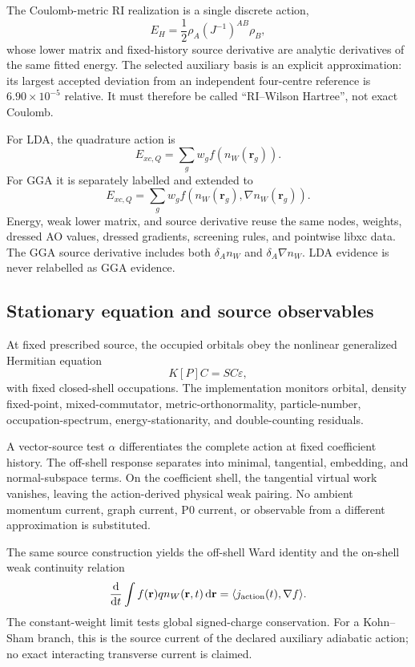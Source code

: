 \documentclass[11pt]{article}
\newcommand{\dd}{\mathrm{d}}
\newcommand{\rvec}{\mathbf r}
\begin{document}
The Coulomb-metric RI realization is a single discrete action,
\begin{equation}
 E_H=\frac12\rho_A(J^{-1})^{AB}\rho_B,
\end{equation}
whose lower matrix and fixed-history source derivative are analytic
derivatives of the same fitted energy.  The selected auxiliary basis is an
explicit approximation: its largest accepted deviation from an independent
four-centre reference is $6.90\times10^{-5}$ relative.  It must therefore be
called ``RI--Wilson Hartree'', not exact Coulomb.

For LDA, the quadrature action is
\begin{equation}
 E_{xc,Q}=\sum_g w_g f(n_W(\rvec_g)).
\end{equation}
For GGA it is separately labelled and extended to
\begin{equation}
 E_{xc,Q}=\sum_g w_g f(n_W(\rvec_g),\nabla n_W(\rvec_g)).
\end{equation}
Energy, weak lower matrix, and source derivative reuse the same nodes,
weights, dressed AO values, dressed gradients, screening rules, and
pointwise libxc data.  The GGA source derivative includes both
$\delta_A n_W$ and $\delta_A\nabla n_W$.  LDA evidence is never relabelled as
GGA evidence.

\subsection{Stationary equation and source observables}

At fixed prescribed source, the occupied orbitals obey the nonlinear
generalized Hermitian equation
\begin{equation}
 K[P]C=SC\varepsilon,
\end{equation}
with fixed closed-shell occupations.  The implementation monitors orbital,
density fixed-point, mixed-commutator, metric-orthonormality, particle-number,
occupation-spectrum, energy-stationarity, and double-counting residuals.

A vector-source test $\alpha$ differentiates the complete action at fixed
coefficient history.  The off-shell response separates into minimal,
tangential, embedding, and normal-subspace terms.  On the coefficient shell,
the tangential virtual work vanishes, leaving the action-derived physical
weak pairing.  No ambient momentum current, graph current, P0 current, or
observable from a different approximation is substituted.

The same source construction yields the off-shell Ward identity and the
on-shell weak continuity relation
\begin{equation}
 \frac{\dd}{\dd t}\int f(\rvec)q n_W(\rvec,t)\,\dd\rvec
 =\langle j_{\rm action}(t),\nabla f\rangle.
\end{equation}
The constant-weight limit tests global signed-charge conservation.  For a
Kohn--Sham branch, this is the source current of the declared auxiliary
adiabatic action; no exact interacting transverse current is claimed.
\end{document}
